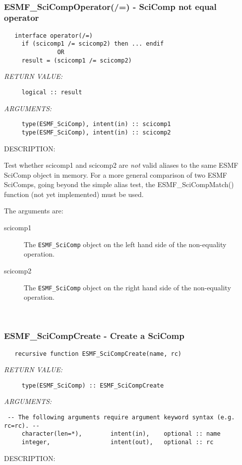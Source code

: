  
\mbox{}\hrulefill\ 
 
\subsubsection [ESMF\_SciCompOperator(/=)] {ESMF\_SciCompOperator(/=) - SciComp not equal operator}


  
\begin{verbatim}   interface operator(/=)
     if (scicomp1 /= scicomp2) then ... endif
               OR
     result = (scicomp1 /= scicomp2)\end{verbatim}{\em RETURN VALUE:}
\begin{verbatim}     logical :: result\end{verbatim}{\em ARGUMENTS:}
\begin{verbatim}     type(ESMF_SciComp), intent(in) :: scicomp1
     type(ESMF_SciComp), intent(in) :: scicomp2\end{verbatim}
{\sf DESCRIPTION:\\ }


     Test whether scicomp1 and scicomp2 are {\it not} valid aliases to the
     same ESMF SciComp object in memory. For a more general comparison of two 
     ESMF SciComps, going beyond the simple alias test, the ESMF\_SciCompMatch()
     function (not yet implemented) must be used.
  
     The arguments are:
     \begin{description}
     \item[scicomp1]
       The {\tt ESMF\_SciComp} object on the left hand side of the non-equality
       operation.
     \item[scicomp2]
       The {\tt ESMF\_SciComp} object on the right hand side of the non-equality
       operation.
     \end{description}
   
 
\mbox{}\hrulefill\ 
 
\subsubsection [ESMF\_SciCompCreate] {ESMF\_SciCompCreate - Create a SciComp}


  
\begin{verbatim}   recursive function ESMF_SciCompCreate(name, rc)\end{verbatim}{\em RETURN VALUE:}
\begin{verbatim}     type(ESMF_SciComp) :: ESMF_SciCompCreate\end{verbatim}{\em ARGUMENTS:}
\begin{verbatim} -- The following arguments require argument keyword syntax (e.g. rc=rc). --
     character(len=*),        intent(in),    optional :: name
     integer,                 intent(out),   optional :: rc\end{verbatim}
{\sf DESCRIPTION:\\ }


